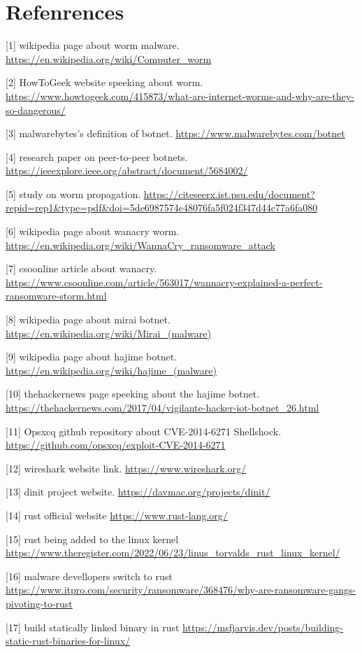 \documentclass[../main.tex]{subfiles}
\begin{document}
	\chapter*{Refenrences}
	{

        [1] wikipedia page about worm malware. \url{https://en.wikipedia.org/wiki/Computer_worm}

        [2] HowToGeek website speeking about worm.
        \url{https://www.howtogeek.com/415873/what-are-internet-worms-and-why-are-they-so-dangerous/}

        [3] malwarebytes's definition of botnet.
        \url{https://www.malwarebytes.com/botnet}

        [4] research paper on peer-to-peer botnets.
        \url{https://ieeexplore.ieee.org/abstract/document/5684002/}

        [5] study on worm propagation.
        \url{https://citeseerx.ist.psu.edu/document?repid=rep1&type=pdf&doi=5de6987574e48076fa5f024f347d44c77a6fa080}

        [6] wikipedia page about wanacry worm.
        \url{https://en.wikipedia.org/wiki/WannaCry_ransomware_attack}

        [7] csoonline article about wanacry.
        \url{https://www.csoonline.com/article/563017/wannacry-explained-a-perfect-ransomware-storm.html}

        [8] wikipedia page about mirai botnet.
        \url{https://en.wikipedia.org/wiki/Mirai_(malware)}

        [9] wikipedia page about hajime botnet.
        \url{https://en.wikipedia.org/wiki/hajime_(malware)}

        [10] thehackernews page speeking about the hajime botnet.
        \url{https://thehackernews.com/2017/04/vigilante-hacker-iot-botnet_26.html}

        [11] Opsxcq github repository about CVE-2014-6271 Shellshock.
        \url{https://github.com/opsxcq/exploit-CVE-2014-6271}

        [12] wireshark website link.
        \url{https://www.wireshark.org/}

        [13] dinit project website.
        \url{https://davmac.org/projects/dinit/}

        [14] rust official website
        \url{https://www.rust-lang.org/}

        [15] rust being added to the linux kernel
        \url{https://www.theregister.com/2022/06/23/linus_torvalds_rust_linux_kernel/}

        [16] malware devellopers switch to rust
        \url{https://www.itpro.com/security/ransomware/368476/why-are-ransomware-gangs-pivoting-to-rust}

        [17] build statically linked binary in rust
        \url{https://msfjarvis.dev/posts/building-static-rust-binaries-for-linux/}

		\vspace{10pt}

	}
\end{document}
